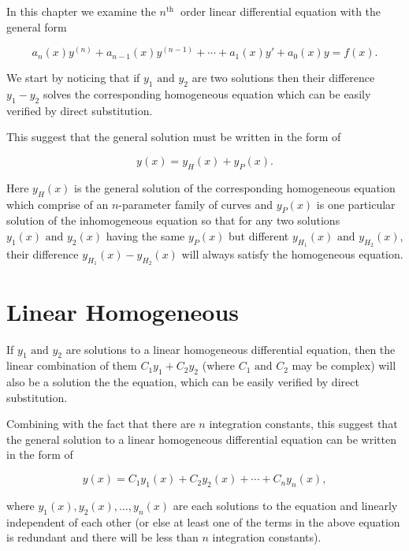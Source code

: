 \documentclass[english,a4paper,12pt]{report}
\begin{document}
In this chapter we examine the \(n^{\text{th }} \) order linear differential equation with the general form

\begin{equation}
    a_{n}(x) y^{(n)} + a_{n-1}(x)y^{(n-1)} + \cdots + a_1 (x)y' + a_0 (x)y = f(x).    
\end{equation}

We start by noticing that if \(y_1 \text { and } y_2 \) are two solutions then their difference \(y_1 -y_2 \) solves the corresponding homogeneous equation which can be easily verified by direct substitution.

This suggest that the general solution must be written in the form of

\begin{equation}
    y(x) = y_{H}(x) + y_{P}(x).  
\end{equation}

Here \(y_{H}(x) \) is the general solution of the corresponding homogeneous equation which comprise of an \(n\)-parameter family of curves and \(y_{P}(x) \) is one particular solution of the inhomogeneous equation so that for any two solutions \(y_1 (x) \text { and } y_2 (x)\) having the same \(y_{P}(x) \) but different \(y_{H_1 }(x) \text { and } y_{H_2 }(x)  \), their difference \(y_{H_1 }(x) - y_{H_2 }(x)\) will always satisfy the homogeneous equation.     

\section{Linear Homogeneous}

If \(y_1 \text { and } y_2  \) are solutions to a linear homogeneous differential equation, then the linear combination of them \(C_1 y_1 + C_2 y_2 \) (where \(C_1 \text { and } C_2\) may be complex) will also be a solution the the equation, which can be easily verified by direct substitution. 

Combining with the fact that there are \(n\) integration constants, this suggest that the general solution to a linear homogeneous differential equation can be written in the form of 

\begin{equation}
    y(x) = C_1 y_1 (x) + C_2 y_2 (x) + \cdots + C_{n}y_{n}(x),  
\end{equation}

where \(y_1 (x), y_2 (x), \ldots , y_{n}(x) \) are each solutions to the equation and linearly independent of each other (or else at least one of the terms in the above equation is redundant and there will be less than \(n\) integration constants).
\end{document}
